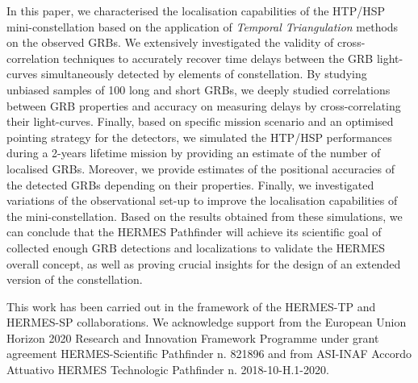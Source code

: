 \documentclass[]{spie}  %
\begin{document}
In this paper, we characterised the localisation capabilities of the HTP/HSP mini-constellation based on the application of \emph{Temporal Triangulation} methods on the observed GRBs. We extensively investigated the validity of cross-correlation techniques to accurately recover time delays between the GRB light-curves simultaneously detected by elements of constellation. By studying unbiased samples of 100 long and short GRBs, we deeply studied correlations between GRB properties and accuracy on measuring delays by cross-correlating their light-curves. Finally, based on specific mission scenario and an optimised pointing strategy for the detectors, we simulated the HTP/HSP performances during a 2-years lifetime mission by providing an estimate of the number of localised GRBs. Moreover, we provide estimates of the positional accuracies of the detected GRBs depending on their properties. Finally, we investigated variations of the observational set-up to improve the localisation capabilities of the mini-constellation. Based on the results obtained from these simulations, we can conclude that the HERMES Pathfinder will achieve its scientific goal of collected enough GRB detections and localizations to validate the HERMES overall concept, as well as proving crucial insights for the design of an extended version of the constellation.






\acknowledgments %
 
This work has been carried out in the framework of the HERMES-TP and HERMES-SP collaborations. We acknowledge support from the European Union Horizon 2020 Research and Innovation Framework Programme under grant agreement HERMES-Scientific Pathfinder n. 821896 and from ASI-INAF Accordo Attuativo HERMES Technologic Pathfinder n. 2018-10-H.1-2020.  


\end{document}
